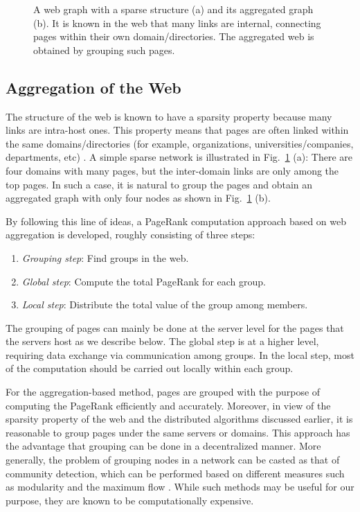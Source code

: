 \documentclass[11pt,draftcls,onecolumn]{IEEEtran}
\begin{document}
\begin{figure}
  \centering
  \caption{A web graph with a sparse structure (a) and 
   its aggregated graph (b). It is known in the web that many links are internal, connecting pages
   within their own domain/directories. The aggregated web is obtained by grouping such pages.}
  \label{fig:aggregation1}  
\end{figure}

\subsection*{Aggregation of the Web}

The structure of the web is known to have a sparsity property because
many links are intra-host ones. This property means that pages are often linked 
within the same domains/directories (for example, organizations, universities/companies, 
departments, etc) \cite{LanMey:06,BroLem_infret:06}. 
A simple sparse network is illustrated in Fig.~\ref{fig:aggregation1} (a):
There are four domains with many pages, but the inter-domain links are only 
among the top pages.
In such a case, it is natural to group the pages and obtain an aggregated
graph with only four nodes as shown in Fig.~\ref{fig:aggregation1} (b).

By following this line of ideas, a PageRank computation approach
based on web aggregation is developed, roughly consisting of three steps: 
\begin{enumerate}
\item[1)] \textit{Grouping step}: Find groups in the web.
\item[2)] \textit{Global step}: Compute the total PageRank for each group.
\item[3)] \textit{Local step}: Distribute the total value of the group among members.
\end{enumerate}
The grouping of pages can mainly be done at the server level for the pages that
the servers host as we describe below.
The global step is at a higher level, requiring data exchange via communication among groups. 
In the local step, most of the computation should be carried out locally
within each group. 

For the aggregation-based method, pages are grouped 
with the purpose of computing the PageRank efficiently and accurately. 
Moreover, in view of the sparsity property of the web and the distributed algorithms 
discussed earlier, 
it is reasonable to group pages under the same servers or domains. This approach
has the advantage that grouping can be done in a decentralized manner.
More generally, the problem of grouping nodes in a network can be casted
as that of community detection, which can be performed based on different
measures such as modularity \cite{Newman:06,ExpEvaBlo:11} 
and the maximum flow \cite{FlaLawGil:02}. While such methods may be useful
for our purpose, they are known to be computationally expensive.
\end{document}

